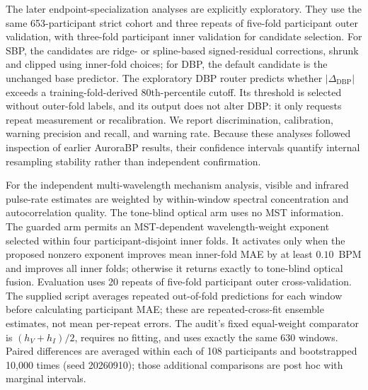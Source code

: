 \documentclass[12pt]{article}
\begin{document}
The later endpoint-specialization analyses are explicitly exploratory. They use the same 653-participant strict cohort and three repeats of five-fold participant outer validation, with three-fold participant inner validation for candidate selection. For SBP, the candidates are ridge- or spline-based signed-residual corrections, shrunk and clipped using inner-fold choices; for DBP, the default candidate is the unchanged base predictor. The exploratory DBP router predicts whether $|\Delta_{\mathrm{DBP}}|$ exceeds a training-fold-derived 80th-percentile cutoff. Its threshold is selected without outer-fold labels, and its output does not alter DBP: it only requests repeat measurement or recalibration. We report discrimination, calibration, warning precision and recall, and warning rate. Because these analyses followed inspection of earlier AuroraBP results, their confidence intervals quantify internal resampling stability rather than independent confirmation.

For the independent multi-wavelength mechanism analysis, visible and infrared pulse-rate estimates are weighted by within-window spectral concentration and autocorrelation quality. The tone-blind optical arm uses no MST information. The guarded arm permits an MST-dependent wavelength-weight exponent selected within four participant-disjoint inner folds. It activates only when the proposed nonzero exponent improves mean inner-fold MAE by at least $0.10$~BPM and improves all inner folds; otherwise it returns exactly to tone-blind optical fusion. Evaluation uses 20 repeats of five-fold participant outer cross-validation. The supplied script averages repeated out-of-fold predictions for each window before calculating participant MAE; these are repeated-cross-fit ensemble estimates, not mean per-repeat errors. The audit's fixed equal-weight comparator is $(h_V+h_I)/2$, requires no fitting, and uses exactly the same 630 windows. Paired differences are averaged within each of 108 participants and bootstrapped 10{,}000 times (seed 20260910); those additional comparisons are post hoc with marginal intervals.
\end{document}
